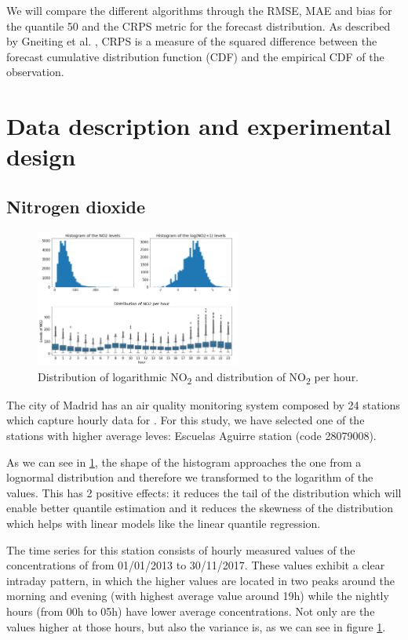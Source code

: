 \documentclass[a4paper,3p,sort&compress]{elsarticle}
\begin{document}
We will compare the different algorithms through the RMSE, MAE and
bias for the quantile 50 and the CRPS metric for the forecast
distribution.  As described by Gneiting et
al. \cite{gneiting_probabilistic_2014}, CRPS is a measure of the
squared difference between the forecast cumulative distribution
function (CDF) and the empirical CDF of the observation.

\section{Data description and experimental design}

\subsection{Nitrogen dioxide}
\label{sec:no2}

\begin{figure}
  \centering
  \includegraphics[width=0.6\textwidth]{histo_variance}
  \caption{\label{figure:histo_variance}Distribution of logarithmic
    NO\textsubscript{2} and distribution of NO\textsubscript{2}
    per hour.}
\end{figure}

The city of Madrid has an air quality monitoring system composed by 24
stations which capture hourly data for \no.  For this study, we have
selected one of the stations with higher average leves: Escuelas
Aguirre station (code 28079008).

As we can see in \ref{figure:histo_variance}, the shape of the histogram
approaches the one from a lognormal distribution and therefore we
transformed to the logarithm of the values. This has 2 positive
effects: it reduces the tail of the distribution which will enable
better quantile estimation and it reduces the skewness of the
distribution which helps with linear models like the linear quantile
regression.

The time series for this station consists of hourly measured values of
the concentrations of \no from 01/01/2013 to
30/11/2017. These values exhibit a clear intraday pattern, in which
the higher values are located in two peaks around the morning and
evening (with highest average value around 19h) while the nightly
hours (from 00h to 05h) have lower average concentrations.  Not only
are the values higher at those hours, but also the variance is, as we
can see in figure \ref{figure:histo_variance}.
 
\end{document}
